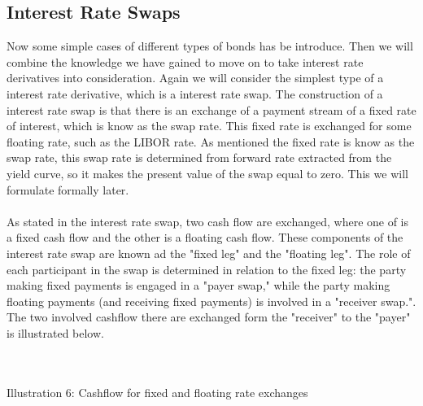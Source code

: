 \subsection{Interest Rate Swaps}
Now some simple cases of different types of bonds has be introduce. Then we will combine the knowledge we have gained to move on
to take interest rate derivatives into consideration. Again we will consider the simplest type of a interest rate derivative, which is a
interest rate swap. The construction of a interest rate swap is that there is an  exchange of a payment stream of a fixed rate of interest,
which is know as the swap rate. This fixed rate is exchanged for some floating rate, such as the LIBOR rate. 
As mentioned the fixed rate is know as the swap rate, this swap rate is determined from forward rate extracted from the yield curve, 
so it makes the present value of the swap equal to zero. This we will formulate formally later. 
\\\\
As stated in the interest rate swap, two cash flow are exchanged, where one of is a 
fixed cash flow and the other is a floating cash flow. These components of
the interest rate swap are known ad the "fixed leg" and the "floating leg". 
The role of each participant in the swap is determined in relation to the 
fixed leg: the party making fixed payments is engaged in a "payer swap," 
while the party making floating payments (and receiving fixed payments) is
involved in a "receiver swap.". The two involved cashflow there are exchanged form the "receiver" to the "payer" is illustrated below.
\\\\
\newpage
\begin{center}
    \\[10pt] 
    Illustration 6: Cashflow for fixed and floating rate exchanges
\end{center} 
